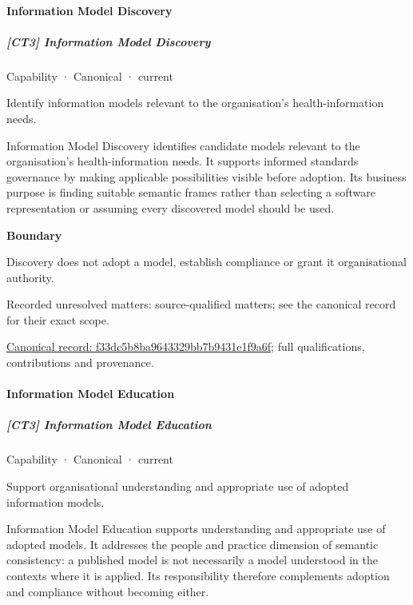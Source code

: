 \paragraph{Information Model Discovery}

\subparagraph{[CT3] Information Model Discovery}

\label{element:f33dc5b8ba9643329bb7b9431e1f9a6f}
{\small Capability · Canonical · current}\par

Identify information models relevant to the organisation’s health-information needs.



Information Model Discovery identifies candidate models relevant to the organisation's health-information needs. It supports informed standards governance by making applicable possibilities visible before adoption. Its business purpose is finding suitable semantic frames rather than selecting a software representation or assuming every discovered model should be used.



\textbf{Boundary}



Discovery does not adopt a model, establish compliance or grant it organisational authority.


{\small Recorded unresolved matters: source-qualified matters; see the canonical record for their exact scope.}\par
{\footnotesize \href{../../../../continuum/strategy/capability/f33dc5b8ba9643329bb7b9431e1f9a6f.md}{Canonical record: f33dc5b8ba9643329bb7b9431e1f9a6f}; full qualifications, contributions and provenance.}\par
\paragraph{Information Model Education}

\subparagraph{[CT3] Information Model Education}

\label{element:7dcb6427f9134fb7a4a63a5ec1d5c85b}
{\small Capability · Canonical · current}\par

Support organisational understanding and appropriate use of adopted information models.



Information Model Education supports understanding and appropriate use of adopted models. It addresses the people and practice dimension of semantic consistency: a published model is not necessarily a model understood in the contexts where it is applied. Its responsibility therefore complements adoption and compliance without becoming either.



